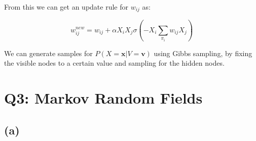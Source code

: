 \documentclass[11pt]{amsart}
\newcommand{\vek}[1]{\mathbf{#1}}
\begin{document}
From this we can get an update rule for $w_{ij}$ as:

\begin{equation}
w_{ij}^{new} = w_{ij} + \alpha X_{i} X_{j} \sigma(-X_{i} \sum_{\pi_i} w_{ij} X_{j})
\end{equation}

We can generate samples for $P(X = \vek{x}  \vert V = \vek{v})$ using Gibbs sampling, by fixing the visible nodes to a certain value and sampling for the hidden nodes. 


\section{Q3: Markov Random Fields}

\subsection{(a)}
\end{document}
